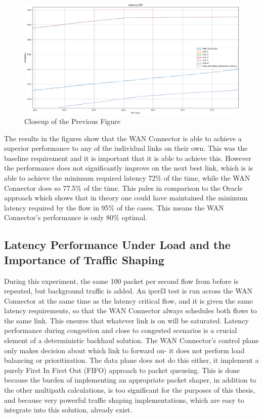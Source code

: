 \begin{figure}[h]
    \centering
        \includegraphics[height=0.66\textwidth,width=\textwidth]{fig/latency_cdf1_super_zoomed_in.png}
        \caption{Closeup of the Previous Figure}
        \label{fig:latency_cdf1_super_zoomed_in}
\end{figure}

The results in the figures show that the WAN Connector is able to achieve a superior performance to any of the individual links on their own. This was the baseline requirement and it is important that it is able to achieve this. However the performance does not significantly improve on the next best link, which is is able to achieve the minimum required latency 72\% of the time, while the WAN Connector does so 77.5\% of the time. This pales in comparison to the Oracle approach which shows that in theory one could have maintained the minimum latency required by the flow in 95\% of the cases. This means the WAN Connector's performance is only 80\% optimal.


\subsection{Latency Performance Under Load and the Importance of Traffic Shaping}

During this experiment, the same 100 packet per second flow from before is repeated, but background traffic is added. An iperf3 test is run across the WAN Connector at the same time as the latency critical flow, and it is given the same latency requirements, so that the WAN Connector always schedules both flows to the same link. This ensures that whatever link is on will be saturated. Latency performance during congestion and close to congested scenarios is a crucial element of a deterministic backhaul solution. The WAN Connector's control plane only makes decision about which link to forward on- it does not perform load balancing or prioritization. The data plane does not do this either, it implement a purely First In First Out (FIFO) approach to packet queueing. This is done because the burden of implementing an appropriate packet shaper, in addition to the other multipath calculations, is too significant for the purposes of this thesis, and because very powerful traffic shaping implementations, which are easy to integrate into this solution, already exist.

